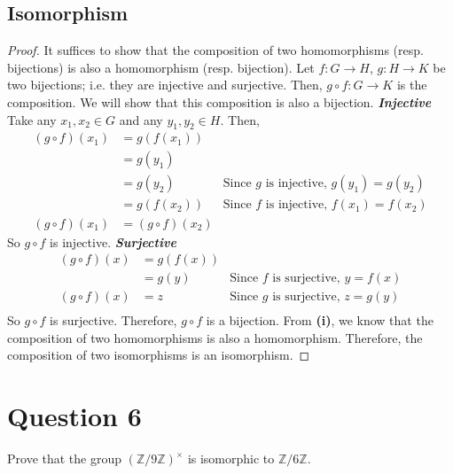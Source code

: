 \documentclass[13pt]{article}
\begin{document}
\subsection*{Isomorphism}
\begin{proof}
    It suffices to show that the composition of two homomorphisms (resp. bijections) is also a 
    homomorphism (resp. bijection). Let $f : G \to H$, $g: H \to K$ be two bijections; i.e. they 
    are injective and surjective. Then, $g \circ f : G \to K$ is the composition. We will show that 
    this composition is also a bijection.
    \newline
    \newline
    \textit{\textbf{Injective}}
    \newline
    Take any $x_1, x_2 \in G$ and any $y_1, y_2 \in H$. Then,
    \begin{align*}
        (g \circ f) (x_1) &= g(f(x_1)) \\
                          &= g(y_1) \\
                          &= g(y_2) & \text{Since $g$ is injective, $g(y_1) = g(y_2)$} \\
                          &= g(f(x_2)) & \text{Since $f$ is injective, $f(x_1) = f(x_2)$} \\
        (g \circ f) (x_1) &= (g \circ f) (x_2)
    \end{align*}
    So $g \circ f$ is injective.
    \newline
    \newline
    \textit{\textbf{Surjective}}
    \begin{align*}
        (g \circ f) (x) &= g(f(x)) \\
                        &= g(y) & \text{Since $f$ is surjective, $y = f(x)$} \\
        (g \circ f)(x) &= z & \text {Since $g$ is surjective, $z = g(y)$} \\
    \end{align*}
So $g \circ f$ is surjective. Therefore, $g \circ f$ is a bijection. From \textbf{(i)}, we know that 
    the composition of two homomorphisms is also a homomorphism. Therefore, the composition of two
    isomorphisms is an isomorphism.
\end{proof}



\newpage
\section*{Question 6}
Prove that the group $(\mathbb{Z}/9\mathbb{Z})^{\times}$ is isomorphic to $\mathbb{Z}/6\mathbb{Z}$.
\end{document}
